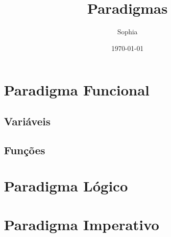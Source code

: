 \documentclass{book}
\date{\today}
\author{Sophia}
\title{Paradigmas}
\begin{document}
  \maketitle

  \tableofcontents

  \chapter{Paradigma Funcional}

    \section{Variáveis} %
    \section{Funções}
  
  \chapter{Paradigma Lógico}
  
  \chapter{Paradigma Imperativo}
\end{document}
